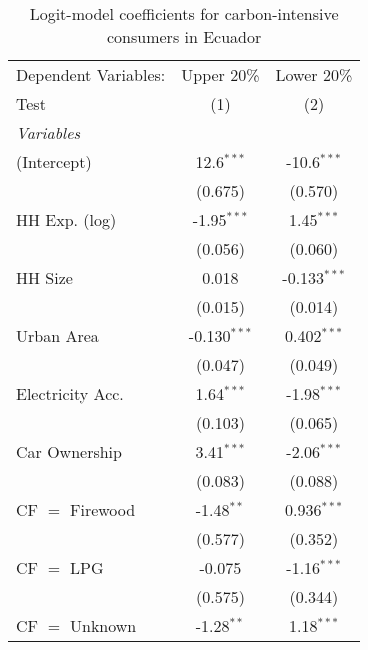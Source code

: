 
\begin{table}[htbp!]
   \centering
   \small
   \begin{adjustbox}{width = 1\textwidth, max height = 0.95\textheight, center}
      \begin{threeparttable}[b]
         \caption{\label{tab:Logit_1_ECU} Logit-model coefficients for carbon-intensive consumers in Ecuador}
         \begin{tabular}{lcc}
            \tabularnewline \midrule \midrule
            Dependent Variables: & Upper 20\%     & Lower 20\%\\   
            Test                 & (1)            & (2)\\  
            \midrule
            \emph{Variables}\\
            (Intercept)          & 12.6$^{***}$   & -10.6$^{***}$\\   
                                 & (0.675)        & (0.570)\\   
            HH Exp. (log)        & -1.95$^{***}$  & 1.45$^{***}$\\   
                                 & (0.056)        & (0.060)\\   
            HH Size              & 0.018          & -0.133$^{***}$\\   
                                 & (0.015)        & (0.014)\\   
            Urban Area           & -0.130$^{***}$ & 0.402$^{***}$\\   
                                 & (0.047)        & (0.049)\\   
            Electricity Acc.     & 1.64$^{***}$   & -1.98$^{***}$\\   
                                 & (0.103)        & (0.065)\\   
            Car Ownership        & 3.41$^{***}$   & -2.06$^{***}$\\   
                                 & (0.083)        & (0.088)\\   
            CF $=$ Firewood      & -1.48$^{**}$   & 0.936$^{***}$\\   
                                 & (0.577)        & (0.352)\\   
            CF $=$ LPG           & -0.075         & -1.16$^{***}$\\   
                                 & (0.575)        & (0.344)\\   
            CF $=$ Unknown       & -1.28$^{**}$   & 1.18$^{***}$\\   

\end{tabular}
\end{threeparttable}
\end{adjustbox}
\end{table}
